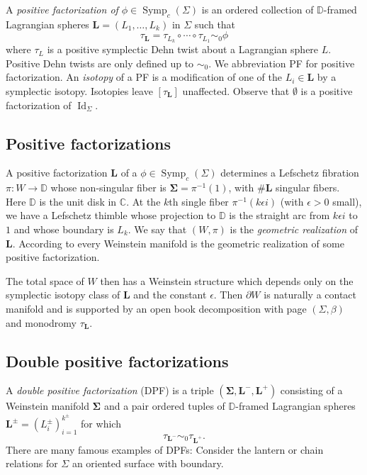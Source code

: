 \documentclass[11pt]{amsart}
\DeclareMathOperator{\Symp}{Symp}
\DeclareMathOperator{\Id}{Id}
\newcommand{\thicc}[1]{\pmb{#1}}
\newcommand{\C}{\mathbb{C}}
\newcommand{\disk}{\mathbb{D}}
\newcommand{\LagTuple}{\thicc{L}}
\begin{document}
A \emph{positive factorization of $\phi \in \Symp_{c}(\Sigma)$} is an ordered collection of $\disk$-framed Lagrangian spheres $\LagTuple = (L_{1}, \dots, L_{k})$ in $\Sigma$ such that
\begin{equation*}
\tau_{\LagTuple} = \tau_{L_{k}} \circ \cdots \circ \tau_{L_{1}} \sim_{0} \phi
\end{equation*}
where $\tau_{L}$ is a positive symplectic Dehn twist about a Lagrangian sphere $L$. Positive Dehn twists are only defined up to $\sim_{0}$. We abbreviation PF for positive factorization. An \emph{isotopy} of a PF is a modification of one of the $L_{i} \in \LagTuple$ by a symplectic isotopy. Isotopies leave $[\tau_{\LagTuple}]$ unaffected. Observe that $\emptyset$ is a positive factorization of $\Id_{\Sigma}$.

\subsection{Positive factorizations}

A positive factorization $\LagTuple$ of a $\phi \in \Symp_{c}(\Sigma)$ determines a Lefschetz fibration $\pi: W \rightarrow \disk$ whose non-singular fiber is $\thicc{\Sigma} = \pi^{-1}(1)$, with $\# \LagTuple$ singular fibers. Here $\disk$ is the unit disk in $\C$. At the $k$th single fiber $\pi^{-1}(k\epsilon i)$ (with $\epsilon > 0$ small), we have a Lefschetz thimble whose projection to $\disk$ is the straight arc from $k\epsilon i$ to $1$ and whose boundary is $L_{k}$. We say that $(W, \pi)$ is the \emph{geometric realization} of $\LagTuple$. According to \cite{BHH:GirouxCorrespondence, GirouxPardon} every Weinstein manifold is the geometric realization of some positive factorization.

The total space of $W$ then has a Weinstein structure which depends only on the symplectic isotopy class of $\LagTuple$ and the constant $\epsilon$. Then $\partial W$ is naturally a contact manifold and is supported by an open book decomposition with page $(\Sigma, \beta)$ and monodromy $\tau_{\LagTuple}$.

\subsection{Double positive factorizations}

A \emph{double positive factorization} (DPF) is a triple $(\thicc{\Sigma}, \LagTuple^{-}, \LagTuple^{+})$ consisting of a Weinstein manifold $\thicc{\Sigma}$ and a pair ordered tuples of $\disk$-framed Lagrangian spheres $\LagTuple^{\pm} = (L^{\pm}_{i})_{i=1}^{k^{\pm}}$ for which
\begin{equation*}
\tau_{\LagTuple^{-}} \sim_{0} \tau_{\LagTuple^{+}}.
\end{equation*}
There are many famous examples of DPFs: Consider the lantern or chain relations for $\Sigma$ an oriented surface with boundary.
\end{document}
